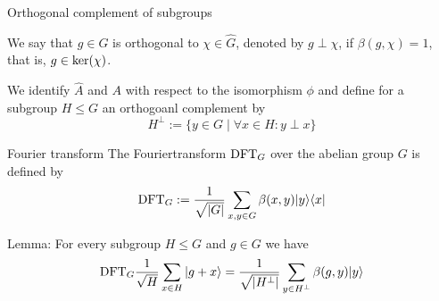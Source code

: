 \documentclass[slideColor]{prosper}
\renewcommand{\>}{\rangle}
\newcommand{\<}{\langle}
\begin{document}

\begin{slide}{Orthogonal complement of subgroups}

\medskip
We say that $g\in G$ is orthogonal to $\chi\in\hat{G}$, denoted by $g \perp \chi$, if $\beta(g,\chi)=1$, that is, $g\in{\rm ker}(\chi)$.

\medskip
We identify $\hat{A}$ and $A$ with respect to the isomorphism $\phi$ and define for a subgroup $H\le G$ an orthogoanl complement by
\[
H^{\perp} := \{y\in G \mid \forall x\in H : y \perp x\} 
\]
\end{slide}


\begin{slide}{Fourier transform}
The Fouriertransform ${\rm DFT}_G$ over the abelian group $G$ is defined by
\[
{\rm DFT}_G := \frac{1}{\sqrt{|G|}} \sum_{x,y\in G} \beta(x,y) |y\>\<x|
\]

Lemma: For every subgroup $H\le G$ and $g\in G$ we have
\[
{\rm DFT}_G \frac{1}{\sqrt{H}} \sum_{x\in H} |g+x\> = \frac{1}{\sqrt{|H^\perp|}} \sum_{y\in H^\perp} \beta(g,y) |y\>
\]
\end{slide}

\end{document}
